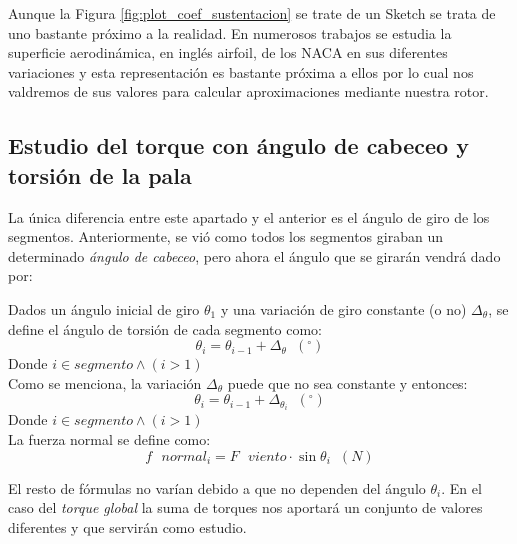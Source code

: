 Aunque la Figura \ref{fig:plot_coef_sustentacion} se trate de un Sketch se trata de uno bastante próximo a la realidad. En numerosos trabajos se estudia la superficie aerodinámica, en inglés airfoil, de los NACA en sus diferentes variaciones y esta representación es bastante próxima a ellos por lo cual nos valdremos de sus valores para calcular aproximaciones mediante nuestra rotor.


 
 \subsection{Estudio del torque con ángulo de cabeceo y torsión de la pala}
\label{section:torque_giro_torsion}

La única diferencia entre este apartado y el anterior es el ángulo de giro de los segmentos. Anteriormente, se vió como todos los segmentos giraban un determinado \textit{ángulo de cabeceo}, pero ahora el ángulo que se girarán vendrá dado por:

Dados un ángulo inicial de giro $\theta_1 $ y una variación de giro constante (o no) $\Delta_\theta$, se define el ángulo de torsión de cada segmento como:
\begin{equation}
\theta_i = \theta_{i-1} + \Delta_\theta \hspace{7pt} (^{\circ})
\label{def:theta_cte}
\end{equation}
Donde $i \in segmento \wedge (i > 1)$\\


Como se menciona, la variación $\Delta_\theta$ puede que no sea constante y entonces:
\begin{equation}
\theta_i = \theta_{i-1} + \Delta_{\theta_{i}}  \hspace{7pt} (^{\circ})
\label{def:theta_nocte}
\end{equation}
Donde $i \in segmento \wedge (i > 1)$\\

La fuerza normal se define como:
\begin{equation}
   f \text{ } normal_i = F \text{ } viento \cdot \sin{\theta_i} \hspace{7pt} (N)
  \label{def:fuerza_normal_torsion}
 \end{equation}

El resto de fórmulas no varían debido a que no dependen del ángulo $\theta_i$. En el caso del \textit{torque global} la suma de torques nos aportará un conjunto de valores diferentes y que servirán como estudio.

